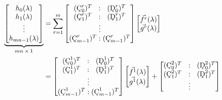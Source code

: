 \documentclass[10pt,reqno,oneside,a4paper]{article}
\begin{document}
\begin{align}
\underbrace{\begin{bmatrix} 
h_0(\lambda) \\ h_1(\lambda) \\ \vdots \\ h_{mn-1}(\lambda)
\end{bmatrix}}_\text{$mn \times 1$}
&= \sum^m_{r=1} \begin{bmatrix} 
(\textup{\c{C}}^r_0)^T \hspace{0.23cm} : \hspace{0.23cm} (\textup{\c{D}}^r_0)^T \\
(\textup{\c{C}}^r_1)^T \hspace{0.23cm}  :  \hspace{0.23cm} (\textup{\c{D}}^r_1)^T \\
\vdots \\
(\textup{\c{C}}^r_{m-1})^T : (\textup{\c{C}}^r_{m-1})^T 
\end{bmatrix}
\begin{bmatrix}  \vec{f^r}(\lambda) \\ \vec{g^r}(\lambda) \end{bmatrix} \nonumber \\
&= 
\begin{bmatrix} 
(\textup{\c{C}}^1_0)^T \hspace{0.23cm} : \hspace{0.23cm} (\textup{\c{D}}^1_0)^T \\
(\textup{\c{C}}^1_1)^T \hspace{0.23cm} : \hspace{0.23cm} (\textup{\c{D}}^1_1)^T \\
\vdots \\
(\textup{\c{C}}^1_{m-1})^T : (\textup{\c{C}}^1_{m-1})^T 
\end{bmatrix}
\begin{bmatrix}  \vec{f^1}(\lambda) \\ \vec{g^1}(\lambda) \end{bmatrix} +
\begin{bmatrix} 
(\textup{\c{C}}^2_0)^T\hspace{0.23cm}  : \hspace{0.23cm} (\textup{\c{D}}^2_0)^T \\
(\textup{\c{C}}^2_1)^T \hspace{0.23cm} : \hspace{0.23cm} (\textup{\c{D}}^2_1)^T \\
\vdots \nonumber \\

\end{bmatrix}
\end{align}
\end{document}
